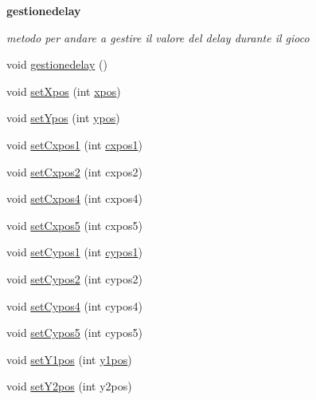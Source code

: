 \begin{Indent}\textbf{ gestionedelay}\par
{\em metodo per andare a gestire il valore del delay durante il gioco }\begin{DoxyCompactItemize}
\item 
void \hyperlink{classcargame_1_1condivisa_a93323c1d8c41c690167fd1b0cea697d5}{gestionedelay} ()
\item 
void \hyperlink{classcargame_1_1condivisa_a7dbd6bcc95ff7838423560d853e1ecec}{set\+Xpos} (int \hyperlink{classcargame_1_1condivisa_a4c8fb3f1c1ae597ee856290390ebc274}{xpos})
\item 
void \hyperlink{classcargame_1_1condivisa_aeb77b8817744feab241516cbf8a559b7}{set\+Ypos} (int \hyperlink{classcargame_1_1condivisa_a4db09a4236b6f591c377857b932eb41a}{ypos})
\item 
void \hyperlink{classcargame_1_1condivisa_a51e9c9ff9a30c46c20bcb013e5bc02f8}{set\+Cxpos1} (int \hyperlink{classcargame_1_1condivisa_ae2dabfc28e9264616512058bf59b8d7d}{cxpos1})
\item 
void \hyperlink{classcargame_1_1condivisa_ace31301facdef5d53bd698061a4805ff}{set\+Cxpos2} (int cxpos2)
\item 
void \hyperlink{classcargame_1_1condivisa_a63cb60098b1e4c023629879a0f46dd01}{set\+Cxpos4} (int cxpos4)
\item 
void \hyperlink{classcargame_1_1condivisa_aec4b4784ef518fa0e3b553c56ee34161}{set\+Cxpos5} (int cxpos5)
\item 
void \hyperlink{classcargame_1_1condivisa_a055bf748dacc07464a59c719b61403e4}{set\+Cypos1} (int \hyperlink{classcargame_1_1condivisa_a4493a5b3d22e1fa918e1aaaa5a858bdf}{cypos1})
\item 
void \hyperlink{classcargame_1_1condivisa_acdb37b1eabbd63bf181251992fddbcfe}{set\+Cypos2} (int cypos2)
\item 
void \hyperlink{classcargame_1_1condivisa_a33402e14739516b3f92c8aa29206b288}{set\+Cypos4} (int cypos4)
\item 
void \hyperlink{classcargame_1_1condivisa_ae1e077b4b6da22211fc4e93d5806a095}{set\+Cypos5} (int cypos5)
\item 
void \hyperlink{classcargame_1_1condivisa_aff8d76fefeea02298942a385888d8161}{set\+Y1pos} (int \hyperlink{classcargame_1_1condivisa_a48fa33e93e6fb92e83f1267b8c9b3b70}{y1pos})
\item 
void \hyperlink{classcargame_1_1condivisa_a596efa01b731811ef9e80909f32af69e}{set\+Y2pos} (int y2pos)
\item 

\end{DoxyCompactItemize}
\end{Indent}
